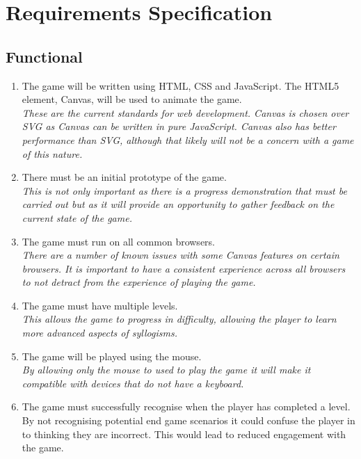 \documentclass[12pt,a4paper]{report}
\begin{document}
\chapter{Requirements Specification}
   \section{Functional}
   \begin{enumerate}[label*=\thesection .\arabic*]
            \item The game will be written using HTML, CSS and JavaScript. The HTML5 element, Canvas, will be used to animate the game.\\
            \textit{These are the current standards for web development. Canvas is chosen over SVG as Canvas can be written in pure JavaScript. Canvas also has better performance than SVG, although that likely will not be a concern with a game of this nature. }
            \item There must be an initial prototype of the game.\\
            \textit{This is not only important as there is a progress demonstration that must be carried out but as it will provide an opportunity to gather feedback on the current state of the game.}
            \item The game must run on all common browsers.\\
            \textit{There are a number of known issues with some Canvas features on certain browsers. It is important to have a consistent experience across all browsers to not detract from the experience of playing the game. }
            \item The game must have multiple levels.\\
            \textit{This allows the game to progress in difficulty, allowing the player to learn more advanced aspects of syllogisms.}
            \item The game will be played using the mouse.\\
            \textit{By allowing only the mouse to used to play the game it will make it compatible with devices that do not have a keyboard.}
            \item The game must successfully recognise when the player has completed a level.\\
            {By not recognising potential end game scenarios it could confuse the player in to thinking they are incorrect. This would lead to reduced engagement with the game.}
        \end{enumerate}
\end{document}
